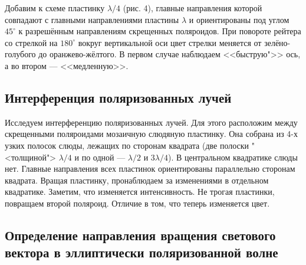 \documentclass[a4paper]{article}
\begin{document}
\noindent Добавим к схеме пластинку $ \lambda/4 $ (рис. 4), главные направления которой совпадают с главными направлениями пластины $\lambda$ и ориентированы под углом $ 45^\circ $ к разрешённым направлениям скрещенных поляроидов. При повороте рейтера со стрелкой на $ 180^\circ $ вокруг вертикальной оси цвет стрелки меняется от зелёно-голубого до оранжево-жёлтого. В первом случае наблюдаем <<быструю">> ось, а во втором --- <<медленную>>.

\subsection{Интерференция поляризованных лучей}

Исследуем интерференцию поляризованных лучей. Для этого расположим между скрещенными поляроидами мозаичную слюдяную пластинку. Она собрана из 4-х узких полосок слюды, лежащих по сторонам квадрата (две полоски "<толщиной"> $ \lambda/4 $ и по одной --- $ \lambda/2 $ и $ 3\lambda/4 $). В центральном квадратике слюды нет. Главные направления всех пластинок ориентированы параллельно сторонам квадрата. Вращая пластинку, пронаблюдаем за изменениями в отдельном квадратике. Заметим, что изменяется интенсивность. Не трогая пластинки, повращаем второй поляроид. Отличие в том, что теперь изменяется цвет.

\subsection{Определение направления вращения светового вектора в эллиптически поляризованной волне}
\end{document}
